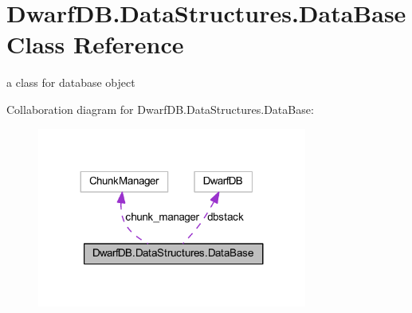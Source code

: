 \hypertarget{class_dwarf_d_b_1_1_data_structures_1_1_data_base}{
\section{DwarfDB.DataStructures.DataBase Class Reference}
\label{class_dwarf_d_b_1_1_data_structures_1_1_data_base}
}


a class for database object  




Collaboration diagram for DwarfDB.DataStructures.DataBase:
\nopagebreak
\begin{figure}[H]
\begin{center}
\leavevmode
\includegraphics[width=251pt]{class_dwarf_d_b_1_1_data_structures_1_1_data_base__coll__graph}
\end{center}
\end{figure}
